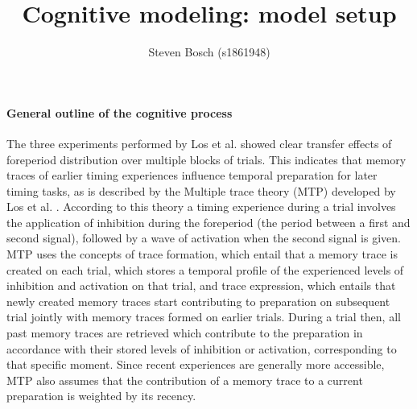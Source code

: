 \documentclass{article}
\title{\vspace{-4ex}\LARGE{Cognitive modeling: model setup}}
\author{\large{Steven Bosch (s1861948)}}
\date{\vspace{-2ex}}
\begin{document}
\maketitle
\paragraph{General outline of the cognitive process}
The three experiments performed by Los et al. \cite{Los1} showed clear transfer effects of foreperiod distribution over multiple blocks of trials. This indicates that memory traces of earlier timing experiences influence temporal preparation for later timing tasks, as is described by the Multiple trace theory (MTP) developed by Los et al. \cite{Los2}. According to this theory a timing experience during a trial involves the application of inhibition during the foreperiod (the period between a first and second signal), followed by a wave of activation when the second signal is given. MTP uses the concepts of trace formation, which entail that a memory trace is created on each trial, which stores a temporal profile of the experienced levels of inhibition and activation on that trial, and trace expression, which entails that newly created memory traces start contributing to preparation on subsequent trial jointly with memory traces formed on earlier trials. During a trial then, all past memory traces are retrieved which contribute to the preparation in accordance with their stored levels of inhibition or activation, corresponding to that specific moment. Since recent experiences are generally more accessible, MTP also assumes that the contribution of a memory trace to a current preparation is weighted by its recency.
\end{document}
